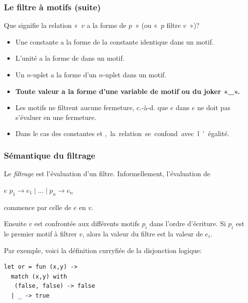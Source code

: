 %
\begin{frame}
\frametitle{Le filtre à motifs (suite)}

Que signifie la relation «~$v$ a la forme de $p$~» (ou «~$p$ filtre
$v$~»)?
\begin{itemize}

  \item Une constante a la forme de la constante identique dans un
  motif.

  \item L'unité \unit{} a la forme de \unit{} dans un motif.

  \item Un $n$-uplet a la forme d'un $n$-uplet dans un motif.

  \item \textbf{Toute valeur a la forme d'une variable de motif ou du
  joker «{\Large \_}».}

\end{itemize}

\bigskip

\remarques

\begin{itemize}

  \item Les motifs ne filtrent aucune fermeture, c.-à-d. que $e$ dans
    \Xmatch{} $e$ \Xwith{} ne doit pas s'évaluer en une fermeture.

  \item Dans le cas des constantes et \unit, la relation se confond
  avec l'égalité.

\end{itemize}

\end{frame}

%
\begin{frame}[containsverbatim]
\frametitle{Sémantique du filtrage}

Le \emph{filtrage} est l'évaluation d'un filtre. Informellement,
l'évaluation de

\centerline{\Xmatch{} $e$ \Xwith{} $p_1 \rightarrow e_1 \mid \ldots
  \mid p_n \rightarrow e_n$} commence par celle de $e$ en $v$.

\bigskip

Ensuite $v$ est confrontée aux différents motifs $p_i$ dans l'ordre
d'écriture. Si $p_i$ est le premier motif à filtrer $v$, alors la
valeur du filtre est la valeur de $e_i$.

\bigskip

Par exemple, voici la définition curryfiée de la disjonction logique:
{\small
\begin{verbatim}
let or = fun (x,y) ->
  match (x,y) with
   (false, false) -> false
  | _ -> true
\end{verbatim}
}

\end{frame}

